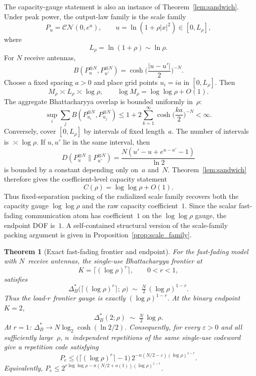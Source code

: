 \documentclass[lettersize,onecolumn]{IEEEtran}
\newtheorem{theorem}{Theorem}
\newcommand{\snr}{\rho}
\begin{document}
The capacity-gauge statement is also an instance of
Theorem~\ref{lem:sandwich}. Under peak power, the output-law family is
the scale family
\[
P_u = \mathcal{CN}(0, e^u),\qquad
u = \ln(1+\snr|x|^2) \in [0, L_\snr],
\]
where
\[
L_\snr = \ln(1+\snr) \sim \ln\snr.
\]
For $N$ receive antennas,
\[
B(P_u^{\otimes N}, P_{u'}^{\otimes N})
= \cosh\!\Big(\frac{|u-u'|}{2}\Big)^{-N}.
\]
Choose a fixed spacing $a > 0$ and place grid points $u_i = ia$ in
$[0, L_\snr]$. Then
\[
M_\snr \asymp L_\snr \asymp \log\snr,\qquad
\log M_\snr = \log\log\snr + O(1).
\]
The aggregate Bhattacharyya overlap is bounded uniformly in~$\snr$:
\[
\sup_i \sum_j B(P_{u_i}^{\otimes N}, P_{u_j}^{\otimes N})
\le 1 + 2\sum_{k=1}^{\infty}
\cosh\!\Big(\frac{ka}{2}\Big)^{-N} < \infty.
\]
Conversely, cover $[0, L_\snr]$ by intervals of fixed length~$a$.
The number of intervals is $\asymp\log\snr$. If $u, u'$ lie in the
same interval, then
\[
D(P_u^{\otimes N} \| P_{u'}^{\otimes N})
= \frac{N(u' - u + e^{u-u'} - 1)}{\ln 2}
\]
is bounded by a constant depending only on~$a$ and~$N$.
Theorem~\ref{lem:sandwich} therefore gives the coefficient-level
capacity statement
\[
C(\snr) = \log\log\snr + O(1).
\]
Thus fixed-separation packing of the radialized scale family recovers
both the capacity gauge $\log\log\snr$ and the raw capacity
coefficient~$1$. Since the scalar fast-fading communication atom has
coefficient~$1$ on the $\log\log\snr$ gauge, the endpoint DOF
is~$1$. A self-contained structural version of the scale-family
packing argument is given in Proposition~\ref{prop:scale_family}.

\begin{theorem}[Exact fast-fading frontier and endpoint]
\label{thm:cross}
For the fast-fading model with $N$~receive antennas, the single-use
Bhattacharyya frontier at
\[
    K=\lceil(\log\snr)^r\rceil,\qquad 0<r<1,
\]
satisfies
\begin{equation}\label{eq:cross_tradeoff}
\Delta_B^*\big(\lceil(\log\snr)^r\rceil;\,\snr\big)
\;\sim\; \tfrac{N}{2}\,(\log\snr)^{1-r}.
\end{equation}
Thus the load-$r$ frontier gauge is exactly
$(\log\snr)^{1-r}$.
At the binary endpoint $K=2$,
\begin{equation}\label{eq:fast_binary}
\Delta_B^*(2;\snr) \;\sim\; \tfrac{N}{2}\,\log\snr.
\end{equation}
At $r=1$: $\Delta_B^* \to N\log_2\!\cosh(\ln 2/2)$.
Consequently, for every $\varepsilon>0$ and all sufficiently
large~$\snr$, $n$~independent repetitions of the same single-use codeword
give a repetition code satisfying
\[
P_e \le
\big(\lceil(\log\snr)^r\rceil-1\big)\,
2^{-n(N/2-\varepsilon)(\log\snr)^{1-r}}.
\]
Equivalently,
$P_e \le 2^{r\log\log\snr - n(N/2+o(1))(\log\snr)^{1-r}}$.
\end{theorem}
\end{document}
